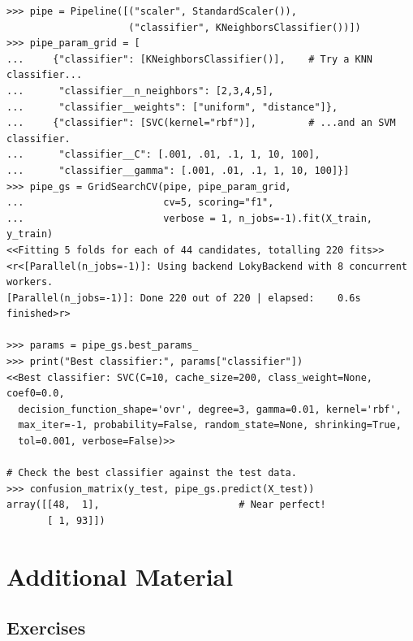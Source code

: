 \begin{lstlisting}
>>> pipe = Pipeline([("scaler", StandardScaler()),
                     ("classifier", KNeighborsClassifier())])
>>> pipe_param_grid = [
...     {"classifier": [KNeighborsClassifier()],    # Try a KNN classifier...
...      "classifier__n_neighbors": [2,3,4,5],
...      "classifier__weights": ["uniform", "distance"]},
...     {"classifier": [SVC(kernel="rbf")],         # ...and an SVM classifier.
...      "classifier__C": [.001, .01, .1, 1, 10, 100],
...      "classifier__gamma": [.001, .01, .1, 1, 10, 100]}]
>>> pipe_gs = GridSearchCV(pipe, pipe_param_grid,
...                        cv=5, scoring="f1",
...                        verbose = 1, n_jobs=-1).fit(X_train, y_train)
<<Fitting 5 folds for each of 44 candidates, totalling 220 fits>>
<r<[Parallel(n_jobs=-1)]: Using backend LokyBackend with 8 concurrent workers.
[Parallel(n_jobs=-1)]: Done 220 out of 220 | elapsed:    0.6s finished>r>

>>> params = pipe_gs.best_params_
>>> print("Best classifier:", params["classifier"])
<<Best classifier: SVC(C=10, cache_size=200, class_weight=None, coef0=0.0,
  decision_function_shape='ovr', degree=3, gamma=0.01, kernel='rbf',
  max_iter=-1, probability=False, random_state=None, shrinking=True,
  tol=0.001, verbose=False)>>

# Check the best classifier against the test data.
>>> confusion_matrix(y_test, pipe_gs.predict(X_test))
array([[48,  1],                        # Near perfect!
       [ 1, 93]])
\end{lstlisting}


\newpage

\section*{Additional Material} %

\subsection*{Exercises} %

